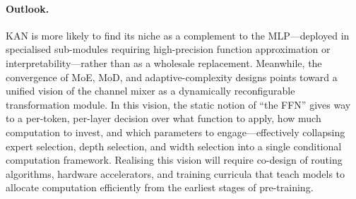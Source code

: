 \paragraph{Outlook.}
KAN is more likely to find its niche as a complement to the MLP---deployed in specialised sub-modules requiring high-precision function approximation or interpretability---rather than as a wholesale replacement.
Meanwhile, the convergence of MoE, MoD, and adaptive-complexity designs points toward a unified vision of the channel mixer as a dynamically reconfigurable transformation module.
In this vision, the static notion of ``the FFN'' gives way to a per-token, per-layer decision over what function to apply, how much computation to invest, and which parameters to engage---effectively collapsing expert selection, depth selection, and width selection into a single conditional computation framework.
Realising this vision will require co-design of routing algorithms, hardware accelerators, and training curricula that teach models to allocate computation efficiently from the earliest stages of pre-training.
